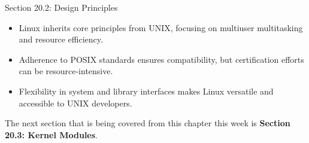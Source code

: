 \begin{notes}{Section 20.2: Design Principles}
    \begin{highlight}
        \begin{itemize}
            \item Linux inherits core principles from UNIX, focusing on multiuser multitasking and resource efficiency.
            \item Adherence to POSIX standards ensures compatibility, but certification efforts can be resource-intensive.
            \item Flexibility in system and library interfaces makes Linux versatile and accessible to UNIX developers.
        \end{itemize}
    \end{highlight}
\end{notes}

The next section that is being covered from this chapter this week is \textbf{Section 20.3: Kernel Modules}.

